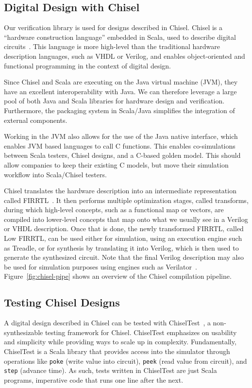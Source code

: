 \documentclass[conference]{IEEEtran}
\begin{document}
\subsection{Digital Design with Chisel}
Our verification library is used for designs described in Chisel.
Chisel is a ``hardware construction language'' embedded in Scala, used to describe digital circuits~\cite{chisel:dac2012}.
This language is more high-level than the traditional hardware description languages, such as VHDL or Verilog, and enables object-oriented and functional programming in the context of digital design.

Since Chisel and Scala are executing on the Java virtual machine (JVM), they have an excellent interoperability with Java. 
We can therefore leverage a large pool of both Java and Scala libraries for hardware design and verification. 
Furthermore, the packaging system in Scala/Java simplifies the integration of external components.

Working in the JVM also allows for the use of the Java native interface, which enables JVM based languages to call C functions.
This enables co-simulations between Scala testers, Chisel designs, and a C-based golden model. 
This should allow companies to keep their existing C models, but move their simulation workflow into Scala/Chisel testers.

Chisel translates the hardware description into an intermediate representation called FIRRTL~\cite{firrtl}. 
It then performs multiple optimization stages, called transforms, during which high-level concepts, such as a functional map or vectors, are compiled into lower-level concepts that map onto what we usually see in a Verilog or VHDL description. 
Once that is done, the newly transformed FIRRTL, called Low FIRRTL, can be used either for simulation, using an execution engine such as Treadle, or for synthesis by translating it into Verilog, which is then used to generate the synthesized circuit. 
Note that the final Verilog description may also be used for simulation purposes using engines such as Verilator~\cite{verilator}. 
Figure~\ref{fig:chisel-pipe} shows an overview of the Chisel compilation pipeline.

\subsection{Testing Chisel Designs}
A digital design described in Chisel can be tested with ChiselTest~\cite{chisel:tester2}, a non-synthesizable testing framework for Chisel.
ChiselTest emphasizes on usability and simplicity while providing ways to scale up in complexity.
Fundamentally, ChiselTest is a Scala library that provides access into the simulator through
operations like \texttt{poke} (write value into circuit), \texttt{peek} (read value from circuit), and \texttt{step} (advance time).
As such, tests written in ChiselTest are just Scala programs, imperative code that runs one line after the next.
\end{document}
